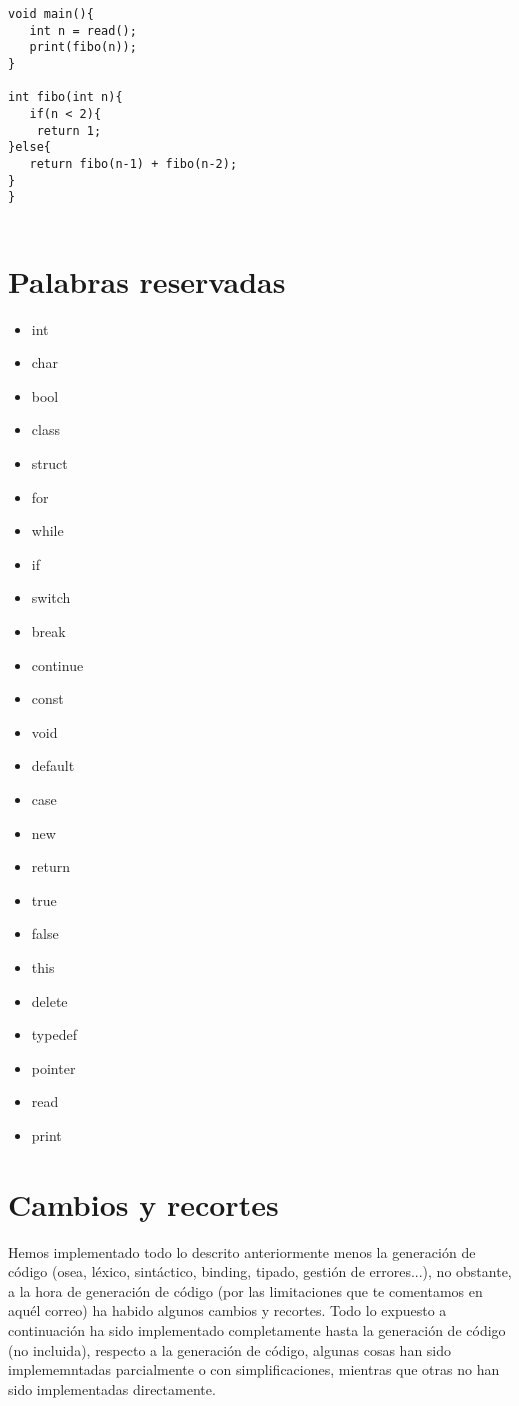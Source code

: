\documentclass{article}
\begin{document}
\begin{lstlisting}[style=CStyle]
void main(){
   int n = read();
   print(fibo(n));
}

int fibo(int n){
   if(n < 2){
	return 1;
}else{
   return fibo(n-1) + fibo(n-2);
}
}


\end{lstlisting}

\section{Palabras reservadas}
\begin{multicols}{5}
\begin{itemize}
    \item int
    \item char
    \item bool
    \item class
    \item struct
    \item for
    \item while
    \item if
    \item switch
    \item break
    \item continue
    \item const
    \item void
    \item default
    \item case
    \item new
    \item return
    \item true
    \item false
    \item this
    \item delete
    \item typedef
    \item pointer
    \item read
    \item print

\end{itemize}
\end{multicols}

\section{Cambios y recortes}
\label{r}
Hemos implementado todo lo descrito anteriormente menos la generación de código (osea, léxico, sintáctico, binding, tipado, gestión de errores...), no obstante, a la hora de generación de código (por las limitaciones que te comentamos en aquél correo) ha habido algunos cambios y recortes. Todo lo expuesto a continuación ha sido implementado completamente hasta la generación de código (no incluida), respecto a la generación de código, algunas cosas han sido implememntadas parcialmente o con simplificaciones, mientras que otras no han sido implementadas directamente.
\end{document}
